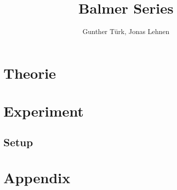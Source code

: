 \documentclass[]{article}
\title{Balmer Series}
\author{Gunther T\"urk, Jonas Lehnen}
\begin{document}
\maketitle
\begin{abstract}


\end{abstract}

\tableofcontents


\section{Theorie}
\section{Experiment}

\subsection{Setup}

\section{Appendix}


\newpage
\begin{thebibliography}{}


\end{thebibliography}
\end{document}
